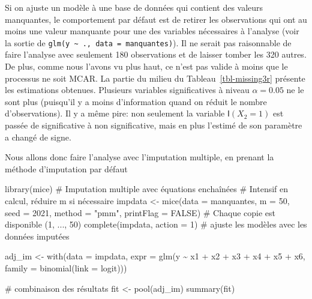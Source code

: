 \documentclass[
  11pt,
  letterpaper,
]{scrbook}
\newenvironment{Shaded}{\begin{snugshade}}{\end{snugshade}}
\newcommand{\AttributeTok}[1]{\textcolor[rgb]{0.40,0.45,0.13}{#1}}
\newcommand{\CommentTok}[1]{\textcolor[rgb]{0.37,0.37,0.37}{#1}}
\newcommand{\ConstantTok}[1]{\textcolor[rgb]{0.56,0.35,0.01}{#1}}
\newcommand{\DecValTok}[1]{\textcolor[rgb]{0.68,0.00,0.00}{#1}}
\newcommand{\FunctionTok}[1]{\textcolor[rgb]{0.28,0.35,0.67}{#1}}
\newcommand{\NormalTok}[1]{\textcolor[rgb]{0.00,0.23,0.31}{#1}}
\newcommand{\OtherTok}[1]{\textcolor[rgb]{0.00,0.23,0.31}{#1}}
\newcommand{\SpecialCharTok}[1]{\textcolor[rgb]{0.37,0.37,0.37}{#1}}
\newcommand{\StringTok}[1]{\textcolor[rgb]{0.13,0.47,0.30}{#1}}
\theoremstyle{definition}
\theoremstyle{remark}
\begin{document}
Si on ajuste un modèle à une base de données qui contient des valeurs
manquantes, le comportement par défaut est de retirer les observations
qui ont au moins une valeur manquante pour une des variables nécessaires
à l'analyse (voir la sortie de
\texttt{glm(y\ \textasciitilde{}\ .,\ data\ =\ manquantes)}). Il ne
serait pas raisonnable de faire l'analyse avec seulement 180
observations et de laisser tomber les 320 autres. De plus, comme nous
l'avons vu plus haut, ce n'est pas valide à moins que le processus ne
soit MCAR. La partie du milieu du Tableau~\ref{tbl-missing3r} présente
les estimations obtenues. Plusieurs variables significatives à niveau
\(\alpha=0.05\) ne le sont plus (puisqu'il y a moins d'information quand
on réduit le nombre d'observations). Il y a même pire: non seulement la
variable \(\mathsf{I}(X_2=1)\) est passée de significative à non
significative, mais en plus l'estimé de son paramètre a changé de signe.

Nous allons donc faire l'analyse avec l'imputation multiple, en prenant
la méthode d'imputation par défaut

\begin{Shaded}
\begin{Highlighting}[]
\FunctionTok{library}\NormalTok{(mice)}
\CommentTok{\# Imputation multiple avec équations enchaînées}
\CommentTok{\# Intensif en calcul, réduire \textasciigrave{}m\textasciigrave{} si nécessaire}
\NormalTok{impdata }\OtherTok{\textless{}{-}} \FunctionTok{mice}\NormalTok{(}\AttributeTok{data =}\NormalTok{ manquantes,}
                \AttributeTok{m =} \DecValTok{50}\NormalTok{,}
                \AttributeTok{seed =} \DecValTok{2021}\NormalTok{,}
                \AttributeTok{method =} \StringTok{"pmm"}\NormalTok{,}
                \AttributeTok{printFlag =} \ConstantTok{FALSE}\NormalTok{)}
\CommentTok{\# Chaque copie est disponible (1, ..., 50)}
\FunctionTok{complete}\NormalTok{(impdata, }\AttributeTok{action =} \DecValTok{1}\NormalTok{)}
\CommentTok{\# ajuste les modèles avec les données imputées}

\NormalTok{adj\_im }\OtherTok{\textless{}{-}} \FunctionTok{with}\NormalTok{(}\AttributeTok{data =}\NormalTok{ impdata,}
               \AttributeTok{expr =} \FunctionTok{glm}\NormalTok{(y }\SpecialCharTok{\textasciitilde{}}\NormalTok{ x1 }\SpecialCharTok{+}\NormalTok{ x2 }\SpecialCharTok{+}\NormalTok{ x3 }\SpecialCharTok{+}\NormalTok{ x4 }\SpecialCharTok{+}\NormalTok{ x5 }\SpecialCharTok{+}\NormalTok{ x6,}
                          \AttributeTok{family =} \FunctionTok{binomial}\NormalTok{(}\AttributeTok{link =} \StringTok{\textquotesingle{}logit\textquotesingle{}}\NormalTok{)))}

\CommentTok{\# combinaison des résultats }
\NormalTok{fit }\OtherTok{\textless{}{-}} \FunctionTok{pool}\NormalTok{(adj\_im)}
\FunctionTok{summary}\NormalTok{(fit)}
\end{Highlighting}
\end{Shaded}
\end{document}
